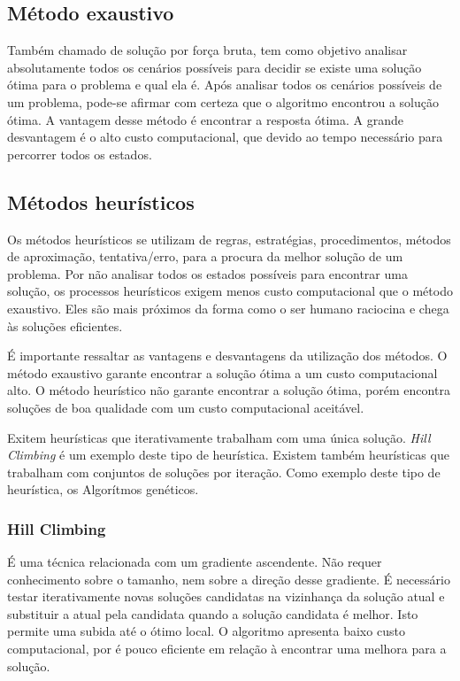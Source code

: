 \documentclass[tc,twoside]{iiufrgs}
\begin{document}
\subsection{Método exaustivo}

Também chamado de solução por força bruta, tem como objetivo analisar absolutamente todos os cenários possíveis para decidir se existe uma solução ótima para o problema e qual ela é. Após analisar todos os cenários possíveis de um problema, pode-se afirmar com certeza que o algoritmo encontrou a solução ótima. A vantagem desse método é encontrar a resposta ótima. A grande desvantagem é o alto custo computacional, que devido ao tempo necessário para percorrer todos os estados. \cite{junior2008proposta} %

\subsection{Métodos heurísticos}

Os métodos heurísticos se utilizam de regras, estratégias, procedimentos, métodos de aproximação, tentativa/erro, para a procura da melhor solução de um problema. Por não analisar todos os estados possíveis para encontrar uma solução, os processos heurísticos exigem menos custo computacional que o método exaustivo. Eles são mais próximos da forma como o ser humano raciocina e chega às soluções eficientes. \cite {junior2008proposta} %

É importante ressaltar as vantagens e desvantagens da utilização dos métodos. O método exaustivo garante encontrar a solução ótima a um custo computacional alto. O método heurístico não garante encontrar a solução ótima, porém encontra soluções de boa qualidade com um custo computacional aceitável. \cite{luke2009metaheuristics} %

Exitem heurísticas que iterativamente trabalham com uma única solução. \textit{Hill Climbing} é um exemplo deste tipo de heurística. Existem também heurísticas que trabalham com conjuntos de soluções por iteração. Como exemplo deste tipo de heurística, os Algorítmos genéticos. \cite{luke2009metaheuristics}%

\subsubsection{Hill Climbing}

É uma técnica relacionada com um gradiente ascendente. Não requer conhecimento sobre o tamanho, nem sobre a direção desse gradiente. É necessário testar iterativamente novas soluções candidatas na vizinhança da solução atual e substituir a atual pela candidata quando a solução candidata é melhor. Isto permite uma subida até o ótimo local. O algoritmo apresenta baixo custo computacional, por é pouco eficiente em relação à encontrar uma melhora para a solução. \cite{luke2009metaheuristics} %
\end{document}
